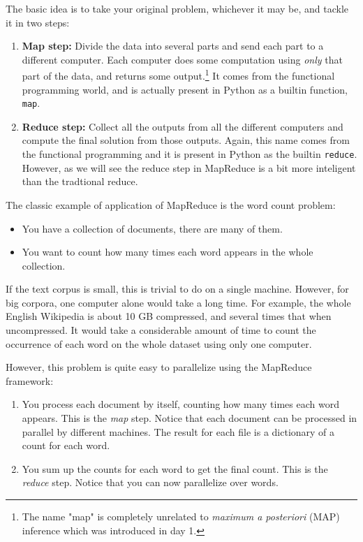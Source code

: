 The basic idea is to take your original problem, whichever it may be, and tackle it in two steps:
%
\begin{enumerate}
\item \textbf{Map step:} Divide the data into several parts and send each part
to a different computer. Each computer does some computation using \emph{only}
that part of the data, and returns some output.\footnote{The name "map" is completely
unrelated to \emph{maximum a posteriori} (MAP) inference which was introduced
in day 1.} It comes from the functional programming world, and is actually
present in Python as a builtin function, \verb+map+.
\item \textbf{Reduce step:} Collect all the outputs from all the different
computers and compute the final solution from those outputs. Again, this name
comes from the functional programming and it is present in Python as the builtin
\verb+reduce+. However, as we will see the reduce step in MapReduce is a bit
more inteligent than the tradtional reduce.
\end{enumerate}

The classic example of application of MapReduce is the word count problem:

\begin{itemize}
\item You have a collection of documents, there are many of them.
\item You want to count how many times each word appears in the whole collection.
\end{itemize}

If the text corpus is small, this is trivial to do on a single machine. However, for big corpora, one computer alone would take a long time. For example, the whole English Wikipedia is about 10 GB compressed, and several times that when uncompressed. It would take a considerable amount of time to count the occurrence of each word on the whole dataset using only one computer.

However, this problem is quite easy to parallelize using the MapReduce framework:

\begin{enumerate}
\item You process each document by itself, counting how many times each word
appears. This is the \emph{map} step. Notice that each document can be
processed in parallel by different machines. The result for each file is a
dictionary of a count for each word.
\item You sum up the counts for each word to get the final count. This is the
\emph{reduce} step. Notice that you can now parallelize over words.
\end{enumerate}

